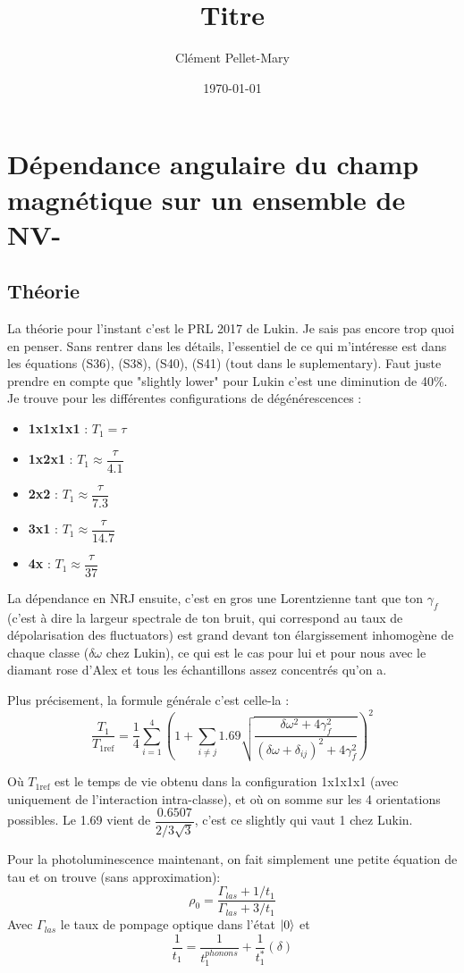 \documentclass[a4paper]{report}
\title{Titre}
\author{Clément Pellet-Mary}
\date\today
\begin{document}
\chapter{Dépendance angulaire du champ magnétique sur un ensemble de NV-}

\section{Théorie}
La théorie pour l'instant c'est le PRL 2017 de Lukin. Je sais pas encore trop quoi en penser. Sans rentrer dans les détails, l'essentiel de ce qui m’intéresse est dans les équations (S36), (S38), (S40), (S41) (tout dans le suplementary). Faut juste prendre en compte que "slightly lower" pour Lukin c'est une diminution de 40\%.
Je trouve pour les différentes configurations de dégénérescences :
\begin{itemize}
\item \textbf{1x1x1x1} : $T_1=\tau$
\item \textbf{1x2x1} : $T_1\approx \dfrac{\tau}{4.1}$
\item \textbf{2x2} : $T_1\approx \dfrac{\tau}{7.3}$
\item \textbf{3x1} : $T_1\approx \dfrac{\tau}{14.7}$
\item \textbf{4x} : $T_1\approx \dfrac{\tau}{37}$
\end{itemize}

La dépendance en NRJ ensuite, c'est en gros une Lorentzienne tant que ton $\gamma_f$ (c'est à dire la largeur spectrale de ton bruit, qui correspond au taux de dépolarisation des fluctuators) est grand devant ton élargissement inhomogène de chaque classe ($\delta \omega$ chez Lukin), ce qui est le cas pour lui et pour nous avec le diamant rose d'Alex et tous les échantillons assez concentrés qu'on a.

Plus précisement, la formule générale c'est celle-la :
\begin{equation}
\dfrac{T_1}{T_{1\mathrm{ref}}} = \dfrac{1}{4} \sum_{i=1}^4 \left(1+\sum_{i \neq j} 1.69 \sqrt{\dfrac{\delta \omega ^2 + 4 \gamma_f^2}{(\delta \omega + \delta_{ij})^2 + 4\gamma_f^2}} \right)^2
\end{equation}

Où $T_{1\mathrm{ref}}$ est le temps de vie obtenu dans la configuration 1x1x1x1 (avec uniquement de l'interaction intra-classe), et où on somme sur les 4 orientations possibles. Le 1.69 vient de $\dfrac{0.6507}{2/3\sqrt{3}}$, c'est ce slightly qui vaut 1 chez Lukin.

Pour la photoluminescence maintenant, on fait simplement une petite équation de tau et on trouve (sans approximation): 
\begin{equation}
\rho_0=\dfrac{\Gamma_{las} + 1/t_1}{\Gamma_{las} + 3/t_1}
\end{equation}
Avec $\Gamma_{las}$ le taux de pompage optique dans l'état $\ket{0}$ et 
\begin{equation}
\dfrac{1}{t_1}=\dfrac{1}{t_1^{phonons}}+\dfrac{1}{t_1^*}(\delta)
\end{equation}
\end{document}
